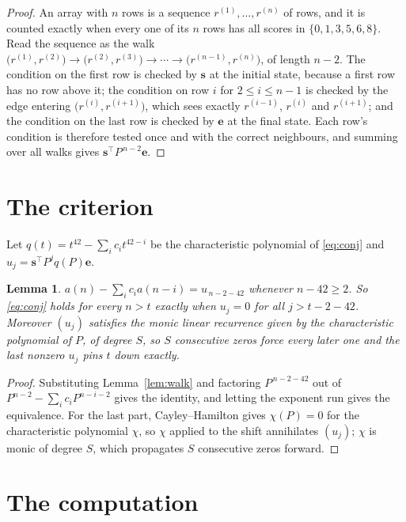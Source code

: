 \documentclass[11pt,a4paper]{article}
\theoremstyle{plain}
\newtheorem{lemma}[theorem]{Lemma}
\theoremstyle{definition}
\begin{document}
\begin{proof}
An array with $n$ rows is a sequence $r^{(1)},\dots,r^{(n)}$ of rows, and it is counted
exactly when every one of its $n$ rows has all scores in $\{0,1,3,5,6,8\}$. Read the sequence as the
walk $\bigl(r^{(1)},r^{(2)}\bigr)\to\bigl(r^{(2)},r^{(3)}\bigr)\to\cdots\to
\bigl(r^{(n-1)},r^{(n)}\bigr)$, of length $n-2$. The condition on the first row is
checked by $\mathbf{s}$ at the initial state, because a first row has no row above it; the
condition on row $i$ for $2\le i\le n-1$ is checked by the edge entering
$\bigl(r^{(i)},r^{(i+1)}\bigr)$, which sees exactly $r^{(i-1)}$, $r^{(i)}$ and
$r^{(i+1)}$; and the condition on the last row is checked by $\mathbf{e}$ at the final
state. Each row's condition is therefore tested once and with the correct neighbours, and
summing over all walks gives $\mathbf{s}^{\!\top}P^{\,n-2}\mathbf{e}$.
\end{proof}

\section{The criterion}

Let $q(t)=t^{42}-\sum_i c_i t^{42-i}$ be the characteristic polynomial of
\eqref{eq:conj} and $u_j=\mathbf{s}^{\!\top}P^{j}q(P)\mathbf{e}$.

\begin{lemma}\label{lem:crit}
$a(n)-\sum_i c_i a(n-i)=u_{\,n-2-42}$ whenever $n-42\ge2$. So \eqref{eq:conj}
holds for every $n>t$ exactly when $u_j=0$ for all $j>t-2-42$. Moreover $(u_j)$
satisfies the monic linear recurrence given by the characteristic polynomial of $P$, of
degree $S$, so $S$ consecutive zeros force every later one and the last nonzero $u_j$ pins
$t$ down exactly.
\end{lemma}

\begin{proof}
Substituting Lemma~\ref{lem:walk} and factoring $P^{\,n-2-42}$ out of
$P^{n-2}-\sum_i c_i P^{n-i-2}$ gives the identity, and letting the exponent run gives the
equivalence. For the last part, Cayley--Hamilton gives $\chi(P)=0$ for the characteristic
polynomial $\chi$, so $\chi$ applied to the shift annihilates $(u_j)$; $\chi$ is monic of
degree $S$, which propagates $S$ consecutive zeros forward.
\end{proof}

\section{The computation}
\end{document}

